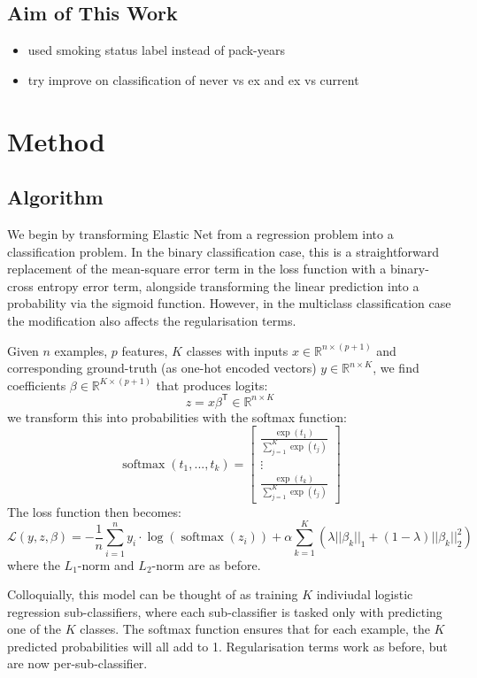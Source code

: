 \documentclass{article}
\DeclareMathOperator*{\softmax}{softmax}
\begin{document}
\subsection{Aim of This Work}
\begin{itemize}
    \item used smoking status label instead of pack-years
    \item try improve on classification of never vs ex and ex vs current
\end{itemize}

\section{Method}

\subsection{Algorithm}
We begin by transforming Elastic Net from a regression problem into a classification problem. In the binary classification case, this is a straightforward replacement of the mean-square error term in the loss function with a binary-cross entropy error term, alongside transforming the linear prediction into a probability via the sigmoid function. However, in the multiclass classification case the modification also affects the regularisation terms.

Given \(n\) examples, \(p\) features, \(K\) classes with inputs \(x \in \mathbb{R}^{n \times (p + 1)}\) and corresponding ground-truth (as one-hot encoded vectors) \(y \in \mathbb{R}^{n \times K}\), we find coefficients \(\beta \in \mathbb{R}^{K \times (p + 1)}\) that produces logits:
\[z = x \beta^\mathsf{T} \in \mathbb{R}^{n \times K}\]
we transform this into probabilities with the softmax function:
\[\softmax(t_1,... , t_k) =
    \begin{bmatrix}
        \frac{\exp(t_1)}{\sum_{j=1}^{K} \exp(t_j)} \\
        \vdots                                     \\
        \frac{\exp(t_k)}{\sum_{j=1}^{K} \exp(t_j)}
    \end{bmatrix}
\]
The loss function then becomes:
\[\mathcal{L}(y, z, \beta) = -\frac{1}{n}\sum_{i=1}^{n} y_i \cdot \log(\softmax(z_i)) + \alpha\sum_{k=1}^{K}(\lambda||\beta_k||_1 + (1 - \lambda)||\beta_k||_2^2)\]
where the \(L_1\)-norm and \(L_2\)-norm are as before.

Colloquially, this model can be thought of as training \(K\) indiviudal logistic regression sub-classifiers, where each sub-classifier is tasked only with predicting one of the \(K\) classes. The softmax function ensures that for each example, the \(K\) predicted probabilities will all add to 1. Regularisation terms work as before, but are now per-sub-classifier.
\end{document}
